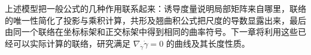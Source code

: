 \ProseParagraphBreak

上述模型把一般公式的几种作用联系起来：诱导度量说明局部矩阵来自哪里，联络的唯一性简化了投影与乘积计算，共形及翘曲积公式把尺度的导数显露出来，最后由同一个联络在坐标标架和正交标架中得到相同的曲率符号。下一章将利用这些已经可以实际计算的联络，研究满足 \(\nabla_{\dot\gamma}\dot\gamma=0\) 的曲线及其长度性质。
